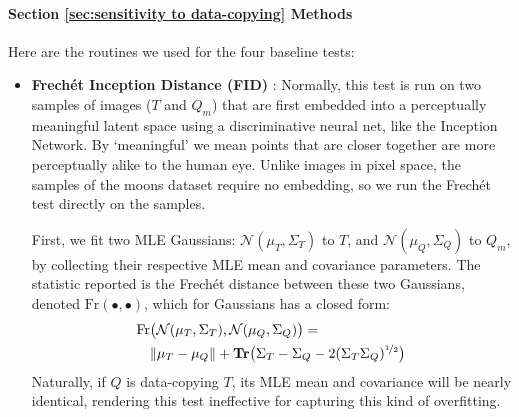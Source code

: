 \paragraph{Section \ref{sec:sensitivity to data-copying} Methods} Here are the routines we used for the four baseline tests: 
\begin{itemize}
    \item \textbf{Frech\'et Inception Distance (FID)} \citep{heusel}: Normally, this test is run on two samples of images ($T$ and $Q_m$) that are first embedded into a perceptually meaningful latent space using a discriminative neural net, like the Inception Network. By `meaningful' we mean points that are closer together are more perceptually alike to the human eye. Unlike images in pixel space, the samples of the moons dataset require no embedding, so we run the Frech\'et test directly on the samples. 
    
    First, we fit two MLE Gaussians: $\mathcal{N}(\mu_T, \Sigma_T)$ to $T$, and $\mathcal{N}(\mu_Q, \Sigma_Q)$ to $Q_m$, by collecting their respective MLE mean and covariance parameters. The statistic reported is the Frech\'et distance between these two Gaussians, denoted $\text{Fr}(\bullet, \bullet)$, which for Gaussians has a closed form: 
    \begin{align*}
        \text{Fr}&\big(\mathcal{N}(\mu_T, \Sigma_T), \mathcal{N}(\mu_Q, \Sigma_Q)\big) = \\
         &\|\mu_T - \mu_Q\| + \textbf{Tr}\big( \Sigma_T - \Sigma_Q - 2(\Sigma_T \Sigma_Q)^{\nicefrac{1}{2}} \big)
    \end{align*}
    Naturally, if $Q$ is data-copying $T$, its MLE mean and covariance will be nearly identical, rendering this test ineffective for capturing this kind of overfitting. 
    

\end{itemize}
